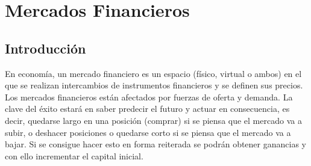\chapter{Mercados Financieros}

\section{Introducción}
En economía, un mercado financiero es un espacio (físico, virtual o ambos) en el que se realizan intercambios de instrumentos financieros y se definen sus precios. Los mercados financieros están afectados por fuerzas de oferta y demanda. La clave del éxito estará en saber predecir el futuro y actuar en consecuencia, es decir, quedarse largo en una posición (comprar) si se piensa que el mercado va a subir, o deshacer posiciones o quedarse corto si se piensa que el mercado va a bajar. Si se consigue hacer esto en forma reiterada se podrán obtener ganancias y con ello incrementar el capital inicial.

